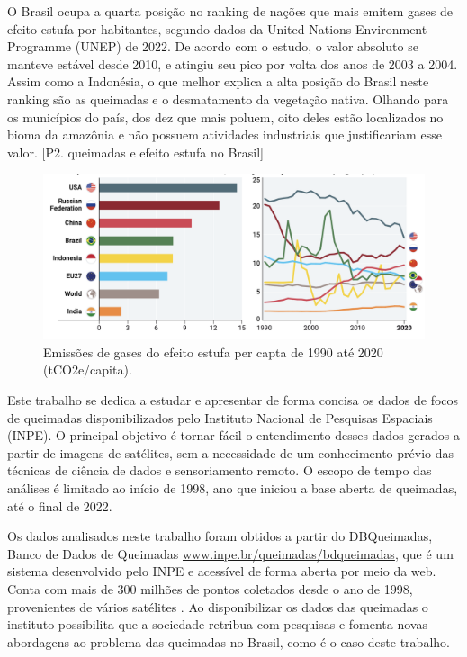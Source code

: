 \documentclass[cic,tc]{iiufrgs}
\begin{document}
O Brasil ocupa a quarta posição no ranking de nações que mais emitem gases de efeito estufa por habitantes, segundo dados da United Nations Environment Programme (UNEP) de 2022. De acordo com o estudo, o valor absoluto se manteve estável desde 2010, e atingiu seu pico por volta dos anos de 2003 a 2004. Assim como a Indonésia, o que melhor explica a alta posição do Brasil neste ranking são as queimadas e o desmatamento da vegetação nativa. Olhando para os municípios do país, dos dez que mais poluem, oito deles estão localizados no bioma da amazônia e não possuem atividades industriais que justificariam esse valor. [P2. queimadas e efeito estufa no Brasil] \par

\begin{figure}[H]
    \caption{Emissões de gases do efeito estufa per capta de 1990 até 2020 (tCO2e/capita).}
    \begin{center}
        \includegraphics[width=35em]{emissoes_gee_per_capta}
    \end{center}
    \label{fig:emissoes_gee_per_capta}
\end{figure}

Este trabalho se dedica a estudar e apresentar de forma concisa os dados de focos de queimadas disponibilizados pelo Instituto Nacional de Pesquisas Espaciais (INPE). O principal objetivo é tornar fácil o entendimento desses dados gerados a partir de imagens de satélites, sem a necessidade de um conhecimento prévio das técnicas de ciência de dados e sensoriamento remoto. O escopo de tempo das análises é limitado ao início de 1998, ano que iniciou a base aberta de queimadas, até o final de 2022. 

Os dados analisados neste trabalho foram obtidos a partir do DBQueimadas, Banco de Dados de Queimadas \url{www.inpe.br/queimadas/bdqueimadas}, que é um sistema desenvolvido pelo INPE e acessível de forma aberta por meio da web. Conta com mais de 300 milhões de pontos coletados desde o ano de 1998, provenientes de vários satélites \citep{setzer2019banco}. Ao disponibilizar os dados das queimadas o instituto possibilita que a sociedade retribua com pesquisas e fomenta novas abordagens ao problema das queimadas no Brasil, como é o caso deste trabalho.
\end{document}
